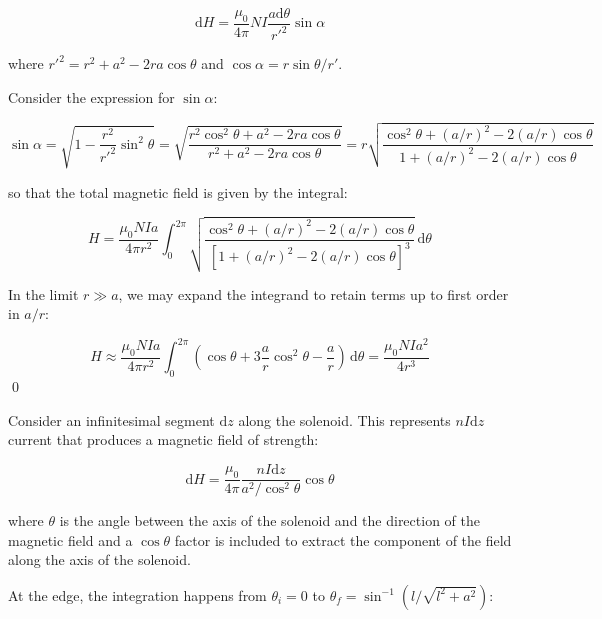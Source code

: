 \documentclass[12pt]{article}
\begin{document}
\begin{equation}
    \mathrm{d}H = \frac{\mu_{0}}{4\pi} NI \frac{a \mathrm{d}\theta}{r'^{2}} \sin{\alpha}
\end{equation}

where $r'^{2} = r^{2} + a^{2} - 2ra \cos{\theta}$ and $\cos{\alpha} = r\sin{\theta}/r'$.

Consider the expression for $\sin{\alpha}$:

\begin{equation}
    \sin{\alpha} = \sqrt{1 - \frac{r^{2}}{r'^{2}} \sin^{2}{\theta}} = \sqrt{\frac{r^{2}\cos^{2}{\theta} + a^{2} - 2ra \cos{\theta}}{r^{2} + a^{2} - 2ra \cos{\theta}}} = r \sqrt{\frac{\cos^{2}{\theta} + (a/r)^{2} - 2(a/r) \cos{\theta}}{1 + (a/r)^{2} - 2(a/r) \cos{\theta}}}
\end{equation}

so that the total magnetic field is given by the integral:

\begin{equation}
    H = \frac{\mu_{0} NIa}{4\pi r^{2}} \int_{0}^{2\pi} \sqrt{\frac{\cos^{2}{\theta} + (a/r)^{2} - 2(a/r) \cos{\theta}}{[1 + (a/r)^{2} - 2(a/r) \cos{\theta}]^{3}}} \, \mathrm{d}\theta
\end{equation}

In the limit $r \gg a$, we may expand the integrand to retain terms up to first order in $a/r$:

\begin{equation}
    H \approx \frac{\mu_{0} NIa}{4\pi r^{2}} \int_{0}^{2\pi} \left( \cos{\theta} + 3 \frac{a}{r} \cos^{2}{\theta} - \frac{a}{r} \right) \, \mathrm{d}\theta = \frac{\mu_{0} NIa^{2}}{4 r^{3}}
\end{equation}
\qed


Consider an infinitesimal segment $\mathrm{d}z$ along the solenoid. This represents $nI \mathrm{d}z$ current that produces a magnetic field of strength:

\begin{equation}
    \mathrm{d}H = \frac{\mu_{0}}{4\pi} \frac{nI \mathrm{d}z}{a^{2}/\cos^{2}{\theta}} \cos{\theta}
\end{equation}

where $\theta$ is the angle between the axis of the solenoid and the direction of the magnetic field and a $\cos{\theta}$ factor is included to extract the component of the field along the axis of the solenoid.

At the edge, the integration happens from $\theta_{i} = 0$ to $\theta_{f} = \sin^{-1}{(l/\sqrt{l^{2} + a^{2}})}$:
\end{document}
